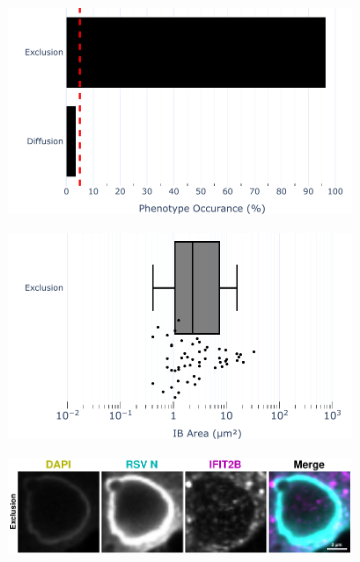 \begin{figure}
    \begin{subfigure}{0.5\textwidth}
        \caption{}
        \includegraphics[width=1\linewidth]{10. Chapter 5/Figs/01. Infection/02. IFIT2B/01. bar_i2b_a549-n.pdf} 
    \end{subfigure}
    \begin{subfigure}{0.5\textwidth}
        \caption{}
        \includegraphics[width=1\linewidth]{10. Chapter 5/Figs/01. Infection/02. IFIT2B/02. box_i2b_a549-n.pdf}
    \end{subfigure}
    \begin{subfigure}{1\textwidth}
        \caption{}
        \includegraphics[width=1\linewidth]{10. Chapter 5/Figs/01. Infection/02. IFIT2B/03. i2b a549 hrsv n.pdf} 

\end{subfigure}
\end{figure}
